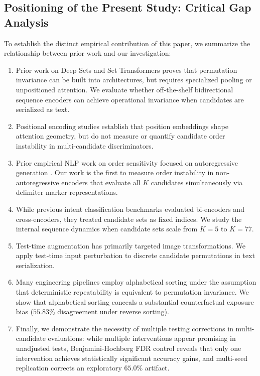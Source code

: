 \documentclass[10pt]{article}
\begin{document}
\subsection{Positioning of the Present Study: Critical Gap Analysis}
To establish the distinct empirical contribution of this paper, we summarize the relationship between prior work and our investigation:
\begin{enumerate}
    \item Prior work on Deep Sets \citep{zaheer2017deep} and Set Transformers \citep{lee2019set} proves that permutation invariance can be built into architectures, but requires specialized pooling or unpositioned attention. We evaluate whether off-the-shelf bidirectional sequence encoders can achieve operational invariance when candidates are serialized as text.
    \item Positional encoding studies \citep{vaswani2017attention, su2024roformer, dufter2022position} establish that position embeddings shape attention geometry, but do not measure or quantify candidate order instability in multi-candidate discriminators.
    \item Prior empirical NLP work on order sensitivity focused on autoregressive generation \citep{lu2022fantastically, zhao2021calibrate, liu2024lost, pezeshkpour2024large, zheng2024large}. Our work is the first to measure order instability in non-autoregressive encoders that evaluate all $K$ candidates simultaneously via delimiter marker representations.
    \item While previous intent classification benchmarks \citep{casanueva2020efficient} evaluated bi-encoders and cross-encoders, they treated candidate sets as fixed indices. We study the internal sequence dynamics when candidate sets scale from $K=5$ to $K=77$.
    \item Test-time augmentation \citep{ayhan2018test, shanmugam2020when} has primarily targeted image transformations. We apply test-time input perturbation to discrete candidate permutations in text serialization.
    \item Many engineering pipelines employ alphabetical sorting under the assumption that deterministic repeatability is equivalent to permutation invariance. We show that alphabetical sorting conceals a substantial counterfactual exposure bias ($55.83\%$ disagreement under reverse sorting).
    \item Finally, we demonstrate the necessity of multiple testing corrections in multi-candidate evaluations: while multiple interventions appear promising in unadjusted tests, Benjamini-Hochberg FDR control reveals that only one intervention achieves statistically significant accuracy gains, and multi-seed replication corrects an exploratory $65.0\%$ artifact.
\end{enumerate}
\end{document}
